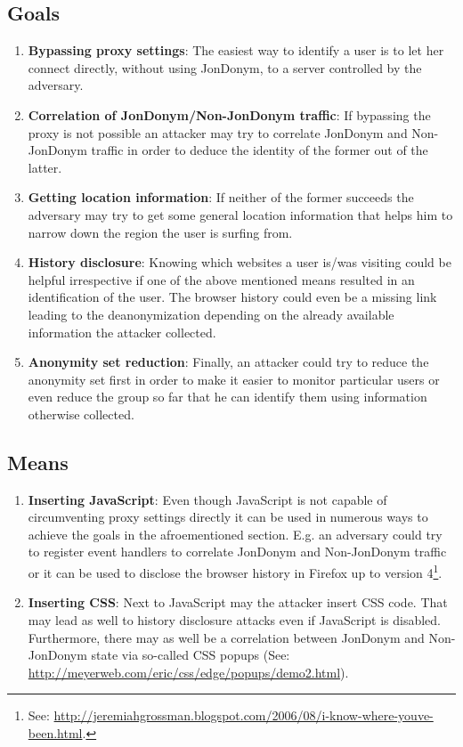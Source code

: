 \documentclass[a4paper,10pt]{scrartcl}
\begin{document}
    \subsection{Goals}\label{attackways}
      \begin{enumerate}
        \item \textbf{Bypassing proxy settings}: The easiest way to identify a
          user is to let her connect directly, without using JonDonym, to a 
          server controlled by the adversary.
        \item \textbf{Correlation of JonDonym/Non-JonDonym traffic}: If 
          bypassing the proxy is not possible an attacker may try to correlate 
          JonDonym and Non-JonDonym traffic in order to deduce the identity of 
          the former out of the latter.
        \item \textbf{Getting location information}: If neither of the former 
          succeeds the adversary may try to get some general location 
          information that helps him to narrow down the region the user is 
          surfing from.
        \item \textbf{History disclosure}: Knowing which websites a user is/was
          visiting could be helpful irrespective if one of the above mentioned
          means resulted in an identification of the user. The browser history
          could even be a missing link leading to the deanonymization depending
          on the already available information the attacker collected.
        \item \textbf{Anonymity set reduction}: Finally, an attacker could try
          to reduce the anonymity set first in order to make it easier to 
          monitor particular users or even reduce the group so far that he can
	  identify them using information otherwise collected. 
      \end{enumerate}
    \subsection{Means}\label{attackmeans}
      \begin{enumerate}
        \item \textbf{Inserting JavaScript}: Even though JavaScript is not 
          capable of circumventing proxy settings directly it can be used in
          numerous ways to achieve the goals in the afroementioned section. E.g. 
          an adversary could try to register event handlers to correlate
          JonDonym and Non-JonDonym traffic or it can be used to disclose the
	  browser history in Firefox up to version 4\footnote{See: 
	  \url{http://jeremiahgrossman.blogspot.com/2006/08/i-know-where-youve-been.html}.}.
        \item \textbf{Inserting CSS}: Next to JavaScript may the attacker 
          insert CSS code. That may lead as well to history disclosure 
          attacks even if JavaScript is disabled. Furthermore, there may
          as well be a correlation between JonDonym and Non-JonDonym state 
	  via so-called CSS popups (See: 
	  \url{http://meyerweb.com/eric/css/edge/popups/demo2.html}).
      \end{enumerate}
\end{document}
